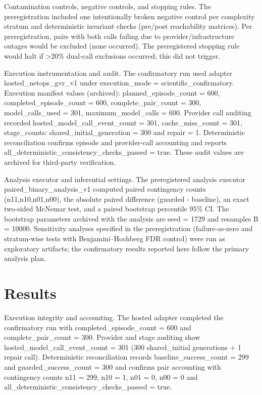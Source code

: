 \documentclass[conference]{IEEEtran}
\begin{document}
Contamination controls, negative controls, and stopping rules. The preregistration included one intentionally broken negative control per complexity stratum and deterministic invariant checks (pre/post reachability matrices). Per preregistration, pairs with both calls failing due to provider/infrastructure outages would be excluded (none occurred). The preregistered stopping rule would halt if >20\% dual‑call exclusions occurred; this did not trigger.

Execution instrumentation and audit. The confirmatory run used adapter hosted\_netops\_gvr\_v1 under execution\_mode = scientific\_confirmatory. Execution manifest values (archived): planned\_episode\_count = 600, completed\_episode\_count = 600, complete\_pair\_count = 300, model\_calls\_used = 301, maximum\_model\_calls = 600. Provider call auditing recorded hosted\_model\_call\_event\_count = 301, cache\_miss\_count = 301, stage\_counts: shared\_initial\_generation = 300 and repair = 1. Deterministic reconciliation confirms episode and provider‑call accounting and reports all\_deterministic\_consistency\_checks\_passed = true. These audit values are archived for third‑party verification.

Analysis executor and inferential settings. The preregistered analysis executor paired\_binary\_analysis\_v1 computed paired contingency counts (n11,n10,n01,n00), the absolute paired difference (guarded - baseline), an exact two‑sided McNemar test, and a paired bootstrap percentile 95\% CI. The bootstrap parameters archived with the analysis are seed = 1729 and resamples B = 10000. Sensitivity analyses specified in the preregistration (failure‑as‑zero and stratum‑wise tests with Benjamini--Hochberg FDR control) were run as exploratory artifacts; the confirmatory results reported here follow the primary analysis plan.

\section{Results}
Execution integrity and accounting. The hosted adapter completed the confirmatory run with completed\_episode\_count = 600 and complete\_pair\_count = 300. Provider and stage auditing show hosted\_model\_call\_event\_count = 301 (300 shared\_initial generations + 1 repair call). Deterministic reconciliation records baseline\_success\_count = 299 and guarded\_success\_count = 300 and confirms pair accounting with contingency counts n11 = 299, n10 = 1, n01 = 0, n00 = 0 and all\_deterministic\_consistency\_checks\_passed = true.
\end{document}
